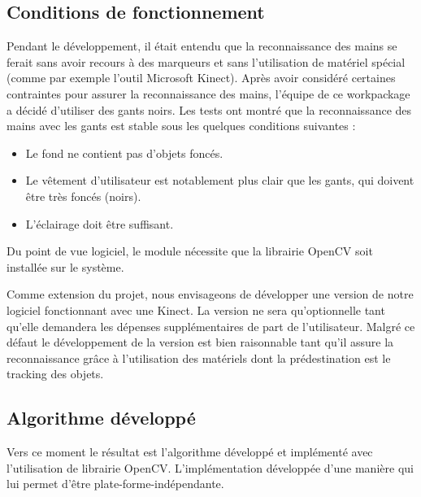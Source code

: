 \subsection{Conditions de fonctionnement}
\par Pendant le développement, il était entendu que la reconnaissance des mains se ferait sans avoir recours à des marqueurs et sans l'utilisation de matériel spécial (comme par exemple l'outil Microsoft Kinect). Après avoir considéré certaines contraintes pour assurer la reconnaissance des mains, l'équipe de ce workpackage a décidé d'utiliser des gants noirs. Les tests ont montré que la reconnaissance des mains avec les gants est stable sous les quelques conditions suivantes : 
\begin{itemize}
\item Le fond ne contient pas d'objets foncés.
\item Le vêtement d'utilisateur est notablement plus clair que les gants, qui doivent être très foncés (noirs).
\item L'éclairage doit être suffisant. 
\end{itemize}
\par Du point de vue logiciel, le module nécessite que la librairie OpenCV soit installée sur le système. 
\par Comme extension du projet, nous envisageons de développer une version de notre logiciel fonctionnant avec une Kinect. La version ne sera qu'optionnelle tant qu'elle demandera les dépenses supplémentaires de part de l'utilisateur. Malgré ce défaut le développement de la version est bien raisonnable tant qu'il assure la reconnaissance grâce à l'utilisation des matériels dont la prédestination est le tracking des objets. 
\subsection{Algorithme développé}
\par Vers ce moment le résultat est l'algorithme développé et implémenté avec l'utilisation de librairie OpenCV. L'implémentation développée d'une manière qui lui permet d'être plate-forme-indépendante.
